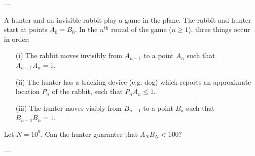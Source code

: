 
---

A hunter and an invisible rabbit play a game in the plane.
The rabbit and hunter start at points $A_0=B_0$. In the $n^\text{th}$ round of the game ($n\ge1$), three things occur in order:
\begin{itemize}
    \item[(i)] The rabbit moves invisibly from $A_{n-1}$ to a point $A_n$ such that $A_{n-1}A_n=1$.
    \item[(ii)] The hunter has a tracking device (e.g. dog) which reports an approximate location $P_n$ of the rabbit, such that $P_nA_n\le1$.
    \item[(iii)] The hunter moves visibly from $B_{n-1}$ to a point $B_n$ such that $B_{n-1}B_n=1$.
\end{itemize}
Let $N=10^9$. Can the hunter guarantee that $A_NB_N<100$?

---

